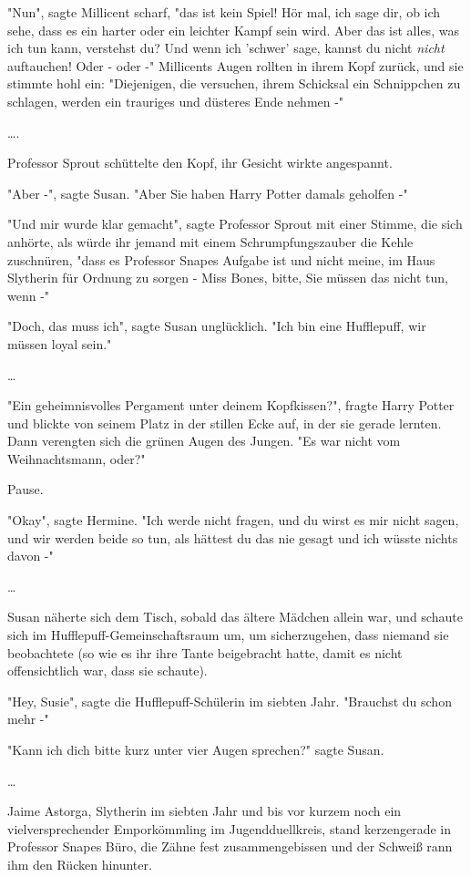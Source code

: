 {"Nun", sagte Millicent scharf, "das ist kein Spiel! Hör mal, ich sage dir, ob ich sehe, dass es ein harter oder ein leichter Kampf sein wird. Aber das ist alles, was ich tun kann, verstehst du? Und wenn ich 'schwer' sage, kannst du nicht \emph{nicht} auftauchen! Oder - oder -" Millicents Augen rollten in ihrem Kopf zurück, und sie stimmte hohl ein: "Diejenigen, die versuchen, ihrem Schicksal ein Schnippchen zu schlagen, werden ein trauriges und düsteres Ende nehmen -"

….

Professor Sprout schüttelte den Kopf, ihr Gesicht wirkte angespannt.

"Aber -", sagte Susan. "Aber Sie haben Harry Potter damals geholfen -"

"Und mir wurde klar gemacht", sagte Professor Sprout mit einer Stimme, die sich anhörte, als würde ihr jemand mit einem Schrumpfungszauber die Kehle zuschnüren, "dass es Professor Snapes Aufgabe ist und nicht meine, im Haus Slytherin für Ordnung zu sorgen - Miss Bones, bitte, Sie müssen das nicht tun, wenn -"

"Doch, das muss ich", sagte Susan unglücklich. "Ich bin eine Hufflepuff, wir müssen loyal sein."

…

"Ein geheimnisvolles Pergament unter deinem Kopfkissen?", fragte Harry Potter und blickte von seinem Platz in der stillen Ecke auf, in der sie gerade lernten. Dann verengten sich die grünen Augen des Jungen. "Es war nicht vom Weihnachtsmann, oder?"

Pause.

"Okay", sagte Hermine. "Ich werde nicht fragen, und du wirst es mir nicht sagen, und wir werden beide so tun, als hättest du das nie gesagt und ich wüsste nichts davon -"

…

Susan näherte sich dem Tisch, sobald das ältere Mädchen allein war, und schaute sich im Hufflepuff-Gemeinschaftsraum um, um sicherzugehen, dass niemand sie beobachtete (so wie es ihr ihre Tante beigebracht hatte, damit es nicht offensichtlich war, dass sie schaute).

"Hey, Susie", sagte die Hufflepuff-Schülerin im siebten Jahr. "Brauchst du schon mehr -"

"Kann ich dich bitte kurz unter vier Augen sprechen?" sagte Susan.

…

Jaime Astorga, Slytherin im siebten Jahr und bis vor kurzem noch ein vielversprechender Emporkömmling im Jugendduellkreis, stand kerzengerade in Professor Snapes Büro, die Zähne fest zusammengebissen und der Schweiß rann ihm den Rücken hinunter.

}

